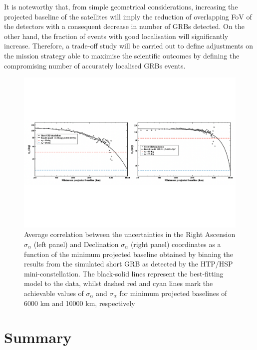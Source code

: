 \documentclass[]{spie}  %
\begin{document}
It is noteworthy that, from simple geometrical considerations, increasing the projected baseline of the satellites will imply the reduction of overlapping FoV of the detectors with a consequent decrease in number of GRBs detected. On the other hand, the fraction of events with good localisation will significantly increase. Therefore, a trade-off study will be carried out to define adjustments on the mission strategy able to maximise the scientific outcomes by defining the compromising number of accurately localised GRBs events.

\begin{figure}[h!]
\centering
\includegraphics[scale=0.6,angle=0]{fig_all_pos_short_reb}
\vspace{-4cm}
\caption{Average correlation between the uncertainties in the Right Ascension $\sigma_\alpha$ (left panel) and Declination $\sigma_\alpha$ (right panel) coordinates as a function of the minimum projected baseline obtained by binning the results from the simulated short GRB as detected by the HTP/HSP mini-constellation. The black-solid lines represent the best-fitting model to the data, whilst dashed red and cyan lines mark the achievable values of $\sigma_\alpha$ and $\sigma_\alpha$ for minimum projected baselines of 6000 km and 10000 km, respectively} 
\label{fig:all_pos_short_reb}
\end{figure}

\section{Summary}
\end{document}
